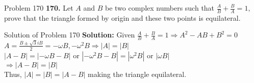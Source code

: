 \documentclass[aspectratio=169,8pt]{beamer}
\begin{document}
\begin{frame}{Problem 170}
  \textbf{170.} Let $A$ and $B$ be two complex numbers such that $\frac{A}{B} + \frac{B}{A}= 1$, prove that the triangle formed by
  origin and these two points is equilateral.
\end{frame}
\begin{frame}{Solution of Problem 170}
  \textbf{Solution:} Given $\frac{A}{B} + \frac{B}{A} = 1 \Rightarrow A^2 - AB + B^2 = 0$\\
  \vspace*{0.2cm}
  $A = \frac{B \pm \sqrt{3}iB}{2} = -\omega B, -\omega^2B\Rightarrow |A| = |B|$\\
  \vspace*{0.2cm}
  $|A - B| = |-\omega B - B|$ or $|-\omega^2B - B| = |\omega^2 B|$ or $|\omega B|$\\
  \vspace*{0.2cm}
  $\Rightarrow |A - B| = |B|$\\
  \vspace*{0.2cm}
  Thus, $|A| = |B| = |A - B|$ making the triangle equilateral.
\end{frame}
\end{document}
